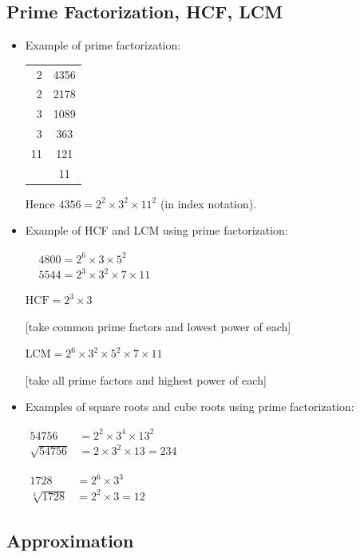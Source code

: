 \documentclass[twocolumn]{article}
\begin{document}
\subsection*{Prime Factorization, HCF, LCM} 

\begin{itemize}
\item Example of prime factorization:

\begin{tabular}{r|c}
	2 & 4356 \\
	\cline { 2 - 2 } 2 & 2178 \\
	\cline { 2 - 2 } 3 & 1089 \\
	\cline { 2 - 2 } 3 & 363 \\
	\cline { 2 - 2 } 11 & 121 \\
	\cline { 2 - 2 } & 11 \\
	\hline 
\end{tabular}

Hence $4356=2^2 \times 3^2 \times 11^2$ (in index notation).

\item Example of HCF and LCM using prime factorization:

$
\begin{aligned}
	& 4800=2^6 \times 3 \times 5^2 \\
	& 5544=2^3 \times 3^2 \times 7 \times 11
\end{aligned}
$

$\mathrm{HCF}=2^3 \times 3$

[take common prime factors and lowest power of each]

$\mathrm{LCM}=2^6 \times 3^2 \times 5^2 \times 7 \times 11$

[take all prime factors and highest power of each]

\item Examples of square roots and cube roots using prime factorization:

$\begin{aligned} 54756 & =2^2 \times 3^4 \times 13^2 \\ \sqrt{54756} & =2 \times 3^2 \times 13 = 234\end{aligned}$

$\begin{aligned} 1728 & =2^6 \times 3^3 \\ \sqrt[3]{1728} & =2^2 \times 3 = 12\end{aligned}$
\end{itemize}

\subsection*{Approximation}
\end{document}
